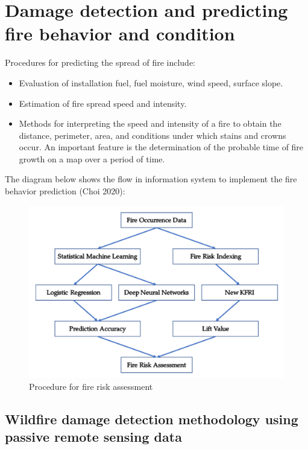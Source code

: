 \chapter{Damage detection and predicting fire behavior and condition}
	\label{cha:methodology}
	
	Procedures for predicting the spread of fire include:
	
	\begin{itemize}
		\item Evaluation of installation fuel, fuel moisture, wind speed, surface slope.
		\item Estimation of fire spread speed and intensity.
		\item Methods for interpreting the speed and intensity of a fire to obtain the distance, perimeter, area, and conditions under which stains and crowns occur. An important feature is the determination of the probable time of fire growth on a map over a period of time.
	\end{itemize}

	The diagram below shows the flow in information system to implement the fire behavior prediction (Choi 2020):
	
	\begin{figure}[H]
		\centering
		\includegraphics[width=0.9\linewidth]{images/fire_assesment_procedure.png}
		\caption{Procedure for fire risk assessment}
		\label{fig:fire_assesment_procedurel}
	\end{figure}
	
\section{Wildfire damage detection methodology using passive remote sensing data}

